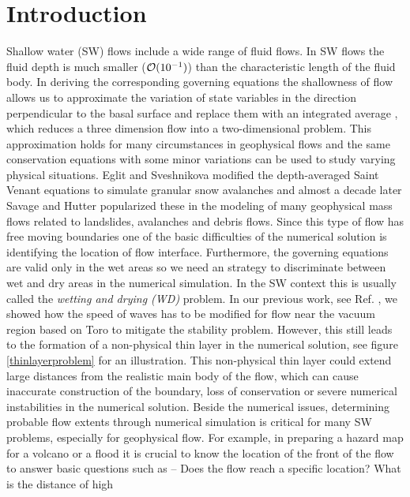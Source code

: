 \documentclass[letterpaper,10pt]{article}
\begin{document}
\section{Introduction} 
\label{introduction}
Shallow water (SW) flows include a wide range of fluid flows. In SW flows the fluid depth is much 
smaller (${\cal O}(10^{-1})$) than the characteristic length of the fluid body. In deriving the corresponding 
governing equations the shallowness of flow allows us to approximate the variation of state variables in the direction perpendicular to the basal surface and replace
them with an integrated average \cite{SavageHutter}, which
reduces a three dimension flow into a two-dimensional problem.
This approximation holds for many circumstances in geophysical flows and the same 
conservation equations with some minor variations can be used to study varying physical situations.
Eglit and Sveshnikova \cite{eglit1980mms} modified the depth-averaged Saint Venant equations to simulate granular snow avalanches and almost a decade later 
Savage and Hutter \cite{SavageHutter} popularized these in the modeling of many geophysical mass flows related to landslides, avalanches and debris flows. 
Since this type of flow has free moving boundaries one of the basic difficulties 
of the numerical solution is identifying the location of flow interface. 
Furthermore, the governing equations are valid only in the wet areas so we need an strategy to discriminate between wet and dry areas in the numerical simulation. 
In the SW context this is usually called the {\it wetting and drying (WD)} problem. %
In our previous work, see Ref. \cite{Patra2005}, we showed how the speed of waves has to be modified for flow near the vacuum region based on Toro \cite{ToroBook2001} to mitigate 
the stability problem. However, this still leads to the formation of a non-physical thin layer in the numerical solution, see figure \ref{thinlayerproblem} for an illustration.
This non-physical thin layer could extend large distances from the realistic main 
body of the flow, which can cause inaccurate construction of the boundary, loss of conservation or severe 
numerical instabilities in the numerical solution. 
Beside the numerical issues, determining probable flow extents through numerical simulation is critical for many SW problems, especially for geophysical flow. For example, in preparing a hazard map 
for a volcano or a flood it is crucial to know the location of the front of the flow to answer basic questions such as --  Does the flow reach a specific location? What is the distance of high 
\end{document}
